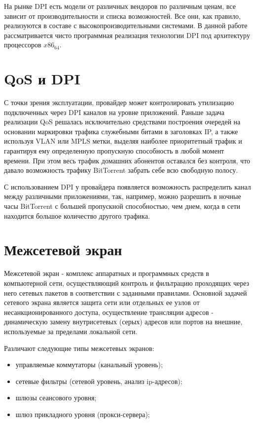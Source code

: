 На рынке DPI есть модели от различных вендоров по различным ценам, все зависит от производительности и списка возможностей. Все они, как правило, реализуются в составе с высокопроизводительными системами. В данной работе рассматривается чисто программная реализация технологии DPI под архитектуру процессоров $x86_64$.


\section{QoS и DPI}
С точки зрения эксплуатации, провайдер может контролировать утилизацию подключенных через DPI каналов на уровне приложений. Раньше задача реализации QoS решалась исключительно средствами построения очередей на основании маркировки трафика служебными битами в заголовках IP, а также используя VLAN или MPLS метки, выделяя наиболее приоритетный трафик и гарантируя ему определенную пропускную способность в любой момент времени. При этом весь трафик домашних абонентов оставался без контроля, что давало возможность трафику BitTorrent забрать себе всю свободную полосу.

С использованием DPI у провайдера появляется возможность распределить канал между различными приложениями, так, например, можно разрешить в ночные часы BitTorrent с большей пропускной способностью, чем днем, когда в сети находится большое количество другого трафика.


\section{Межсетевой экран}
Межсетевой экран - комплекс аппаратных и программных средств в компьютерной сети, осуществляющий контроль и фильтрацию проходящих через него сетевых пакетов в соответствии с заданными правилами. Основной задачей сетевого экрана является защита сети или отдельных ее узлов от несанкционированного доступа, осуществление трансляции адресов - динамическую замену внутрисетевых (серых) адресов или портов на внешние, используемые за пределами локальной сети.

Различают следующие типы межсетевых экранов:
\begin{itemize}
\item управляемые коммутаторы (канальный уровень);
\item сетевые фильтры (сетевой уровень, анализ ip-адресов);
\item шлюзы сеансового уровня;
\item шлюз прикладного уровня (прокси-сервера);
\end{itemize}


